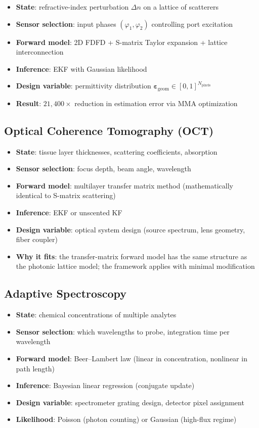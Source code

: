 \documentclass[11pt,a4paper]{article}
\begin{document}
\begin{itemize}[nosep]
  \item \textbf{State}: refractive-index perturbation $\Delta n$ on a lattice of scatterers
  \item \textbf{Sensor selection}: input phases $(\varphi_1, \varphi_2)$ controlling port excitation
  \item \textbf{Forward model}: 2D FDFD + S-matrix Taylor expansion + lattice interconnection
  \item \textbf{Inference}: EKF with Gaussian likelihood
  \item \textbf{Design variable}: permittivity distribution $\bm{\varepsilon}_{\text{geom}} \in [0,1]^{N_\text{pixels}}$
  \item \textbf{Result}: $21{,}400\times$ reduction in estimation error via MMA optimization
\end{itemize}

\subsection{Optical Coherence Tomography (OCT)}

\begin{itemize}[nosep]
  \item \textbf{State}: tissue layer thicknesses, scattering coefficients, absorption
  \item \textbf{Sensor selection}: focus depth, beam angle, wavelength
  \item \textbf{Forward model}: multilayer transfer matrix method (mathematically identical to S-matrix scattering)
  \item \textbf{Inference}: EKF or unscented KF
  \item \textbf{Design variable}: optical system design (source spectrum, lens geometry, fiber coupler)
  \item \textbf{Why it fits}: the transfer-matrix forward model has the same structure as the photonic lattice model; the framework applies with minimal modification
\end{itemize}

\subsection{Adaptive Spectroscopy}

\begin{itemize}[nosep]
  \item \textbf{State}: chemical concentrations of multiple analytes
  \item \textbf{Sensor selection}: which wavelengths to probe, integration time per wavelength
  \item \textbf{Forward model}: Beer--Lambert law (linear in concentration, nonlinear in path length)
  \item \textbf{Inference}: Bayesian linear regression (conjugate update)
  \item \textbf{Design variable}: spectrometer grating design, detector pixel assignment
  \item \textbf{Likelihood}: Poisson (photon counting) or Gaussian (high-flux regime)
\end{itemize}
\end{document}
